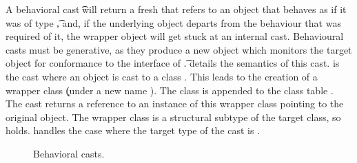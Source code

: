 \documentclass[a4paper,USenglish]{tex/lipics-v2016}
\begin{document}
A behavioral cast \BehCast\t\a will return a fresh \ap that refers to an
object that behaves as if it was of type \t, and, if the underlying object
departs from the behaviour that was required of it, the wrapper object will get
stuck at an internal cast. Behavioural casts must be generative, as they produce
a new object which monitors the target object for conformance to the interface 
of \t.  details the semantics of this cast.  is the
cast where an object \obj\C{\b\a} is cast to a class \Cp. This leads to the
creation of a wrapper class \k (under a new name \D). The class is appended
to the class table \K.  The cast returns a reference \ap to an instance of
this wrapper class pointing to the original object. The wrapper class is a
structural subtype of the target class, so \D\Sub\C holds. 
handles the case where the target type of the cast is \any.


\begin{figure}[!ht]
\hrulefill

\vspace{-2mm}

{  \small
  \begin{mathpar}

\end{mathpar}}  

\vspace{-2mm}
\hrulefill
\caption{Behavioral casts.}\label{behave}
\end{figure}
\end{document}
